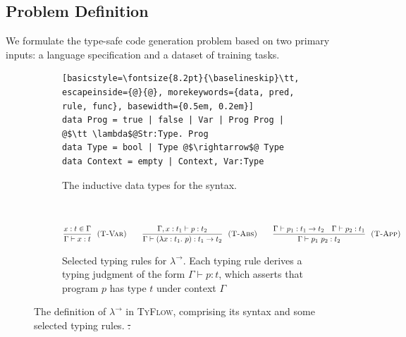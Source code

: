 \documentclass[manuscript,screen]{acmart}
\makeatletter
\newcommand{\stlctype}[3]{{#1} \vdash {#2} : {#3}}
\newcommand{\toolname}[1]{\textsc{#1}}
\newcommand{\scode}[1]{{\fontsize{8.2pt}{\baselineskip}\tt \texttt{\spaceskip=0.15em #1}}}
\newcommand{\mainname}{\toolname{TyFlow}\xspace}
\newcommand{\stlc}{\lambda^{\rightarrow}}
\providecommand{\DIFadd}[1]{{\protect\color{blue}\uwave{#1}}} %
\providecommand{\DIFdel}[1]{{\protect\color{red}\sout{#1}}} %
\providecommand{\DIFaddFL}[1]{\DIFadd{#1}} %
\providecommand{\DIFdelFL}[1]{\DIFdel{#1}} %
\providecommand{\DIFaddbeginFL}{} %
\providecommand{\DIFaddendFL}{} %
\providecommand{\DIFdelbeginFL}{} %
\providecommand{\DIFdelendFL}{} %
\providecommand{\DIFscaledelfig}{0.5}
\newlength{\DIFdelgraphicswidth} %
\newlength{\DIFdelgraphicsheight} %
\providecommand{\DIFaddincludegraphics}[2][]{{\color{blue}\fbox{\DIFOincludegraphics[#1]{#2}}}} %
\providecommand{\DIFdelincludegraphics}[2][]{%
\sbox{\DIFdelgraphicsbox}{\DIFOincludegraphics[#1]{#2}}%
\settoboxwidth{\DIFdelgraphicswidth}{\DIFdelgraphicsbox} %
\settoboxtotalheight{\DIFdelgraphicsheight}{\DIFdelgraphicsbox} %
\scalebox{\DIFscaledelfig}{%
\parbox[b]{\DIFdelgraphicswidth}{\usebox{\DIFdelgraphicsbox}\\[-\baselineskip] \rule{\DIFdelgraphicswidth}{0em}}\llap{\resizebox{\DIFdelgraphicswidth}{\DIFdelgraphicsheight}{%
\setlength{\unitlength}{\DIFdelgraphicswidth}%
\begin{picture}(1,1)%
\thicklines\linethickness{2pt} %
{\color[rgb]{1,0,0}\put(0,0){\framebox(1,1){}}}%
{\color[rgb]{1,0,0}\put(0,0){\line( 1,1){1}}}%
{\color[rgb]{1,0,0}\put(0,1){\line(1,-1){1}}}%
\end{picture}%
}\hspace*{3pt}}} %
} %
\DeclareRobustCommand{\DIFaddbeginFL}{\DIFOaddbeginFL \let\includegraphics\DIFaddincludegraphics} %
\DeclareRobustCommand{\DIFaddendFL}{\DIFOaddendFL \let\includegraphics\DIFOincludegraphics} %
\DeclareRobustCommand{\DIFdelbeginFL}{\DIFOdelbeginFL \let\includegraphics\DIFdelincludegraphics} %
\DeclareRobustCommand{\DIFdelendFL}{\DIFOaddendFL \let\includegraphics\DIFOincludegraphics} %
\let\sout@orig\sout %
\renewcommand{\sout}[1]{\ifmmode\text{\sout@orig{\ensuremath{#1}}}\else\sout@orig{#1}\fi} %
\makeatother
\begin{document}
\subsection{Problem Definition} \label{subsection:moti-problem}
We formulate the type-safe code generation problem based on two primary inputs: a language specification and a dataset of training tasks.

\newcommand{\checkBinding}[3]{\ensuremath{{#2}:{#3} \in {#1}}}
\newcommand{\abs}[3]{\ensuremath{\lambda {#1}:{#2}.\ {#3}}}
\newcommand{\vari}[1]{\ensuremath{{#1}}}
\newcommand{\snoc}[3]{\ensuremath{{#1}, {#2}:{#3}}}
\newcommand{\arr}[2]{\ensuremath{{#1}\rightarrow {#2}}}
\newcommand{\app}[2]{\ensuremath{{#1}\ {#2}}}
\newcommand{\rulename}[1]{\textsc{#1}}

\begin{figure}[t]
\hfill
\begin{subfigure}{0.65\textwidth}
\begin{lstlisting}[basicstyle=\fontsize{8.2pt}{\baselineskip}\tt, escapeinside={@}{@}, morekeywords={data, pred, rule, func}, basewidth={0.5em, 0.2em}] 
data Prog = true | false | Var | Prog Prog | @$\tt \lambda$@Str:Type. Prog
data Type = bool | Type @$\rightarrow$@ Type      
data Context = empty | Context, Var:Type
\end{lstlisting}
\vspace{-0.5em}
\caption{The inductive data types for the syntax.} \label{figure:stlc-syntax}
\end{subfigure}
\hfill\ 

\vspace{1em}

\begin{subfigure}{0.8\textwidth}
\small

\begin{gather*}
\frac{\checkBinding{\Gamma}{x}{t}}{\stlctype{\Gamma}{\vari x}{t}} \ \ \textsc{(T-Var)} \qquad
\frac{\stlctype{\snoc{\Gamma}{x}{t_1}}{p}{t_2}}{\stlctype{\Gamma}{\left(\abs{x}{t_1}{p}\right)}{\arr{t_1}{ t_2}}} \ \ \textsc{(T-Abs)} \qquad
\frac{\stlctype{\Gamma}{p_1}{\arr{t_1}{t_2}} \quad \stlctype{\Gamma}{p_2}{t_1}}{\stlctype{\Gamma}{\app{p_1}{p_2}}{t_2}} \ \ \textsc{(T-App)} \qquad
\end{gather*}
\vspace{-0.5em}
\caption{Selected typing rules for $\stlc$. Each typing rule derives a typing judgment of the form $\stlctype{\Gamma}{p}{t}$, which asserts that program $p$ has type $t$ under context $\Gamma$\DIFaddbeginFL \DIFaddFL{.}\DIFaddendFL } 
    \label{figure:stlc-rules}
\end{subfigure}
\vspace{-0.5em}
\caption{The definition of $\stlc$ in \mainname, comprising its syntax and some selected typing rules.
\DIFdelbeginFL \DIFdelFL{.
}\DIFdelendFL }
\label{figure:stlc-definition}
\end{figure}
\end{document}
